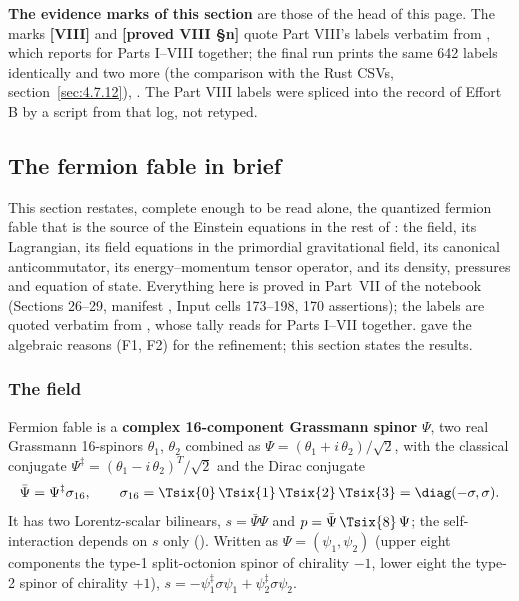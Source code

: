 \textbf{The evidence marks of this section} are those of the head of this page. The marks \textbf{[VIII]} and \textbf{[proved VIII \S{}n]} quote Part VIII's labels verbatim from , which reports  for Parts I--VIII together; the final run  prints the same 642 labels identically and two more (the comparison with the Rust CSVs, section~\ref{sec:4.7.12}), . The Part VIII labels were spliced into the record of Effort B by a script from that log, not retyped.

\medskip

\subsection{The fermion fable in brief}
\label{sec:4.1}

This section restates, complete enough to be read alone, the quantized fermion fable that is the
source of the Einstein equations in the rest of : the field, its Lagrangian, its field
equations in the primordial gravitational field, its canonical anticommutator, its energy--momentum
tensor operator, and its density, pressures and equation of state. Everything here is proved in
Part~VII of the notebook (Sections 26--29, manifest , Input cells
173--198, 170 assertions); the labels are quoted verbatim from
, whose tally reads
 for Parts I--VII together.
 gave the algebraic reasons (F1, F2) for the refinement; this section states the
results.

\subsubsection{The field}
\label{sec:4.1.1}

Fermion fable is a \textbf{complex 16-component Grassmann spinor} $\Psi$, two real Grassmann
16-spinors $\theta_1$, $\theta_2$ combined as $\Psi=(\theta_1+i\,\theta_2)/\sqrt2$, with the classical
conjugate $\Psi^{\ddagger}=(\theta_1-i\,\theta_2)^{T}/\sqrt2$ and the Dirac conjugate
\[
  \bar\Psi=\Psi^{\ddagger}\sigma_{16},\qquad
  \sigma_{16}=\Tsix{0}\,\Tsix{1}\,\Tsix{2}\,\Tsix{3}=\diag(-\sigma,\sigma) .
\]
It has two Lorentz-scalar bilinears, $s=\bar\Psi\Psi$ and $p=\bar\Psi\,\Tsix{8}\,\Psi$; the
self-interaction depends on $s$ only (). Written as $\Psi=(\psi_1,\psi_2)$ (upper eight
components the type-1 split-octonion spinor of chirality $-1$, lower eight the type-2 spinor of
chirality $+1$), $s=-\psi_1^{\ddagger}\sigma\psi_1+\psi_2^{\ddagger}\sigma\psi_2$.

